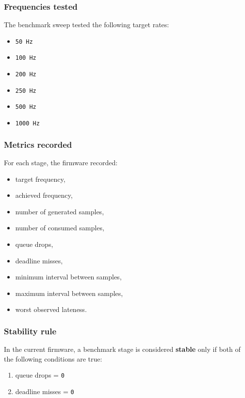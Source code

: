 \documentclass[12pt,a4paper]{article}
\begin{document}
\subsubsection*{Frequencies tested}

The benchmark sweep tested the following target rates:

\begin{itemize}
    \item \texttt{50 Hz}
    \item \texttt{100 Hz}
    \item \texttt{200 Hz}
    \item \texttt{250 Hz}
    \item \texttt{500 Hz}
    \item \texttt{1000 Hz}
\end{itemize}

\subsubsection*{Metrics recorded}

For each stage, the firmware recorded:

\begin{itemize}
    \item target frequency,
    \item achieved frequency,
    \item number of generated samples,
    \item number of consumed samples,
    \item queue drops,
    \item deadline misses,
    \item minimum interval between samples,
    \item maximum interval between samples,
    \item worst observed lateness.
\end{itemize}

\subsubsection*{Stability rule}

In the current firmware, a benchmark stage is considered \textbf{stable} only
if both of the following conditions are true:

\begin{enumerate}[label=\arabic*.]
    \item queue drops = \texttt{0}
    \item deadline misses = \texttt{0}
\end{enumerate}
\end{document}
